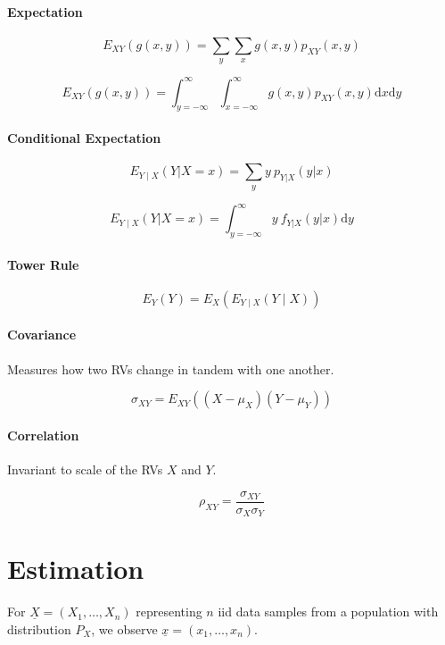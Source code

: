 \documentclass[twocolumn,english]{article}
\begin{document}
\paragraph{Expectation}

\[
E_{XY}\left(g\left(x,y\right)\right)=\sum_{y}\sum_{x}g\left(x,y\right)p_{XY}\left(x,y\right)
\]

\[
E_{XY}\left(g\left(x,y\right)\right)=\int_{y=-\infty}^{\infty}\int_{x=-\infty}^{\infty}g\left(x,y\right)p_{XY}\left(x,y\right)\text{d}x\text{d}y
\]

\paragraph{Conditional Expectation}

\[
E_{Y\mid X}\left(Y|X=x\right)=\sum_{y}y\:p_{Y|X}\left(y|x\right)
\]

\[
E_{Y\mid X}\left(Y|X=x\right)=\int_{y=-\infty}^{\infty}y\:f_{Y|X}\left(y|x\right)\text{d}y
\]

\paragraph{Tower Rule}

\[
E_{Y}\left(Y\right)=E_{X}\left(E_{Y\mid X}\left(Y\mid X\right)\right)
\]

\paragraph{Covariance}

Measures how two RVs change in tandem with one another.

\[
\sigma_{XY}=E_{XY}\left(\left(X-\mu_{X}\right)\left(Y-\mu_{Y}\right)\right)
\]

\paragraph{Correlation}

Invariant to scale of the RVs $X$ and $Y$.

\[
\rho_{XY}=\frac{\sigma_{XY}}{\sigma_{X}\sigma_{Y}}
\]

\section{Estimation}

For $\underline{X}=\left(X_{1},\dots,X_{n}\right)$ representing $n$
iid data samples from a population with distribution $P_{X}$, we
observe $\underline{x}=\left(x_{1},\dots,x_{n}\right)$.
\end{document}
